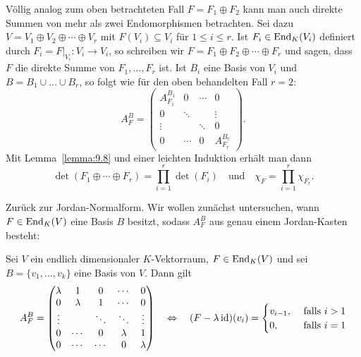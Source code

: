 Völlig analog zum oben betrachteten Fall $F = F_1 \oplus F_2$ kann man auch direkte Summen von mehr als zwei Endomorphismen betrachten.
Sei dazu $V = V_1 \oplus V_2 \oplus \cdots \oplus V_r$ mit $F(V_i) \subseteq V_i$ für $1 \leq i \leq r$.
Ist $F_i \in \operatorname{End}_K(V_i)$ definiert durch $F_i = F\big|_{V_i}\colon V_i \rightarrow V_i$, so schreiben wir $F = F_1 \oplus F_2 \oplus \cdots \oplus F_r$ und sagen, dass $F$ die direkte Summe von $F_1,\dots,F_r$ ist.
Ist $B_i$ eine Basis von $V_i$ und $B = B_1 \cup \dots \cup B_r$, so folgt wie für den oben behandelten Fall $r=2$:
\[
	A_F^B = \begin{pmatrix}
		A_{F_1}^{B_1} & 0 & \cdots & 0 \\
		0 & \ddots & & \vdots \\
		\vdots & & \ddots & 0 \\
		0 & \cdots & 0 & A_{F_r}^{B_r}
	\end{pmatrix}.
\]
Mit Lemma~\ref{lemma:9.8} und einer leichten Induktion erhält man dann
\begin{equation}
	\det(F_1 \oplus \cdots \oplus F_r) = \prod_{i=1}^{r} \det(F_i) \quad \text{und} \quad \chi_F = \prod_{i=1}^{r} \chi_{F_r}. \label{eq:9.1}
\end{equation}

Zurück zur Jordan-Normalform.
Wir wollen zunächst untersuchen, wann $F \in \operatorname{End}_K(V)$ eine Basis $B$ besitzt, sodass $A_F^B$ aus genau einem Jordan-Kasten besteht:

\begin{lemma}
	\label{lemma:9.9}
	Sei $V$ ein endlich dimensionaler $K$-Vektorraum, $F \in \operatorname{End}_K(V)$ und sei $B = \{v_1,\dots,v_k\}$ eine Basis von $V$.
	Dann gilt
	\begin{equation}
		A_F^B = \begin{pmatrix}
		\lambda & 1 & 0 & \cdots & 0 \\ 
		0 & \lambda & 1 & \cdots & 0 \\ 
		\vdots &  & \ddots & \ddots & \vdots \\ 
		0 & \cdots & 0 & \lambda & 1 \\ 
		0 & \cdots & \cdots & 0 & \lambda
		\end{pmatrix} \quad \Leftrightarrow \quad (F-\lambda \operatorname{id})(v_i) = \begin{cases}
			v_{i-1}, & \text{ falls } i > 1 \\
			0, & \text{ falls } i = 1
		\end{cases} \label{eq:9.2}
	\end{equation}
\end{lemma}

